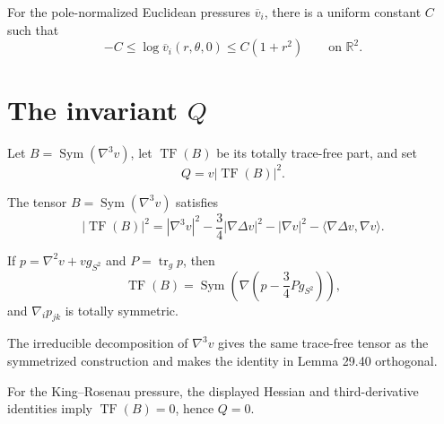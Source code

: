 \begin{lemma}
\label{lem:chow-iv-rescaled-pressure-growth}
For the pole-normalized Euclidean pressures \(\overline v_i\), there is a
uniform constant \(C\) such that
\[
 -C\le\log\overline v_i(r,\theta,0)\le C(1+r^2)
 \qquad\text{on }\mathbb R^2.
\]
\end{lemma}

\section{\texorpdfstring{The invariant \(Q\)}{The invariant Q}}

Let \(B=\operatorname{Sym}(\nabla^3v)\), let
\(\operatorname{TF}(B)\) be its totally trace-free part, and set
\[
 Q=v|\operatorname{TF}(B)|^2.
\]

\begin{lemma}
\label{lem:chow-iv-trace-free-third-derivative}
The tensor \(B=\operatorname{Sym}(\nabla^3v)\) satisfies
\[
 |\operatorname{TF}(B)|^2=|\nabla^3v|^2-\frac34|\nabla\Delta v|^2
 -|\nabla v|^2-\langle\nabla\Delta v,\nabla v\rangle.
\]
\end{lemma}

\begin{remark}
\label{rem:chow-iv-q-alternative-formula}
If \(p=\nabla^2v+vg_{S^2}\) and \(P=\operatorname{tr}_g p\), then
\[
 \operatorname{TF}(B)=
 \operatorname{Sym}\!\left(\nabla\left(p-\frac34Pg_{S^2}\right)\right),
\]
and \(\nabla_i p_{jk}\) is totally symmetric.
\end{remark}

\begin{remark}
\label{rem:chow-iv-third-derivative-decomposition}
The irreducible decomposition of \(\nabla^3v\) gives the same trace-free
tensor as the symmetrized construction and makes the identity in Lemma 29.40
orthogonal.
\end{remark}

\begin{remark}
\label{rem:chow-iv-q-vanishes-king-rosenau}
For the King--Rosenau pressure, the displayed Hessian and third-derivative
identities imply \(\operatorname{TF}(B)=0\), hence \(Q=0\).
\end{remark}

